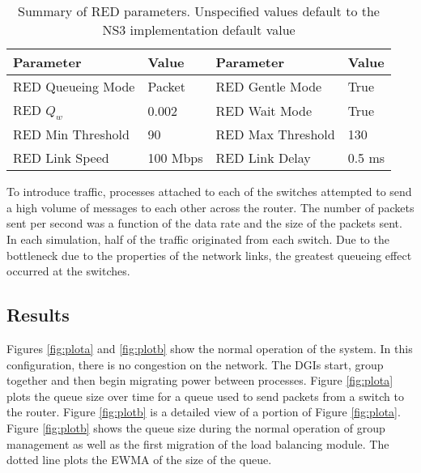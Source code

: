 \begin{table}
\begin{center}
\begin{tabular}{ | l | l || l | l | } \hline
Parameter & Value & Parameter & Value        \\ \hline
RED Queueing Mode & Packet & RED Gentle Mode & True    \\ \hline
RED $Q_{w}$ & 0.002 & RED Wait Mode & True      \\ \hline
RED Min Threshold & 90 & RED Max Threshold & 130   \\ \hline
RED Link Speed & 100 Mbps & RED Link Delay & 0.5 ms   \\ \hline
\end{tabular}
\end{center}
\caption{Summary of \ac{RED} parameters. Unspecified values default to the \ac{NS3} implementation default value}
\label{tab:red-parameters}
\end{table}

To introduce traffic, processes attached to each of the switches attempted to send a high volume of messages to each other across the router.
The number of packets sent per second was a function of the data rate and the size of the packets sent.
In each simulation, half of the traffic originated from each switch.
Due to the bottleneck due to the properties of the network links, the greatest queueing effect occurred at the switches.

\subsection{Results}
\label{sect:results}
Figures \ref{fig:plota} and \ref{fig:plotb} show the normal operation of the system.
In this configuration, there is no congestion on the network. 
The \ac{DGI}s start, group together and then begin migrating power between processes.
Figure \ref{fig:plota} plots the queue size over time for a queue used to send packets from a switch to the router.
Figure \ref{fig:plotb} is a detailed view of a portion of Figure \ref{fig:plota}.
Figure \ref{fig:plotb} shows the queue size during the normal operation of group management as well as the first migration of the load balancing module.
The dotted line plots the \ac{EWMA} of the size of the queue.

